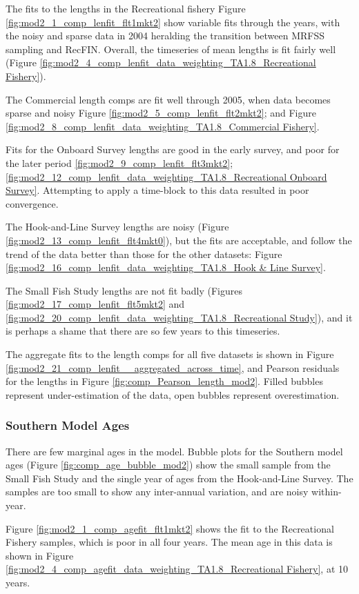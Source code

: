 \documentclass[12pt,]{article}
\begin{document}
The fits to the lengths in the Recreational fishery Figure
\ref{fig:mod2_1_comp_lenfit_flt1mkt2} show variable fits through the
years, with the noisy and sparse data in 2004 heralding the transition
between MRFSS sampling and RecFIN. Overall, the timeseries of mean
lengths is fit fairly well (Figure
\ref{fig:mod2_4_comp_lenfit_data_weighting_TA1.8_Recreational Fishery}).

The Commercial length comps are fit well through 2005, when data becomes
sparse and noisy Figure \ref{fig:mod2_5_comp_lenfit_flt2mkt2}; and
Figure
\ref{fig:mod2_8_comp_lenfit_data_weighting_TA1.8_Commercial Fishery}.

Fits for the Onboard Survey lengths are good in the early survey, and
poor for the later period \ref{fig:mod2_9_comp_lenfit_flt3mkt2};
\ref{fig:mod2_12_comp_lenfit_data_weighting_TA1.8_Recreational Onboard Survey}.
Attempting to apply a time-block to this data resulted in poor
convergence.

The Hook-and-Line Survey lengths are noisy (Figure
\ref{fig:mod2_13_comp_lenfit_flt4mkt0}), but the fits are acceptable,
and follow the trend of the data better than those for the other
datasets: Figure
\ref{fig:mod2_16_comp_lenfit_data_weighting_TA1.8_Hook & Line Survey}.

The Small Fish Study lengths are not fit badly (Figures
\ref{fig:mod2_17_comp_lenfit_flt5mkt2} and
\ref{fig:mod2_20_comp_lenfit_data_weighting_TA1.8_Recreational Study}),
and it is perhaps a shame that there are so few years to this
timeseries.

The aggregate fits to the length comps for all five datasets is shown in
Figure \ref{fig:mod2_21_comp_lenfit__aggregated_across_time}, and
Pearson residuals for the lengths in Figure
\ref{fig:comp_Pearson_length_mod2}. Filled bubbles represent
under-estimation of the data, open bubbles represent overestimation.

\subsubsection{Southern Model Ages}\label{southern-model-ages}

There are few marginal ages in the model. Bubble plots for the Southern
model ages (Figure \ref{fig:comp_age_bubble_mod2}) show the small sample
from the Small Fish Study and the single year of ages from the
Hook-and-Line Survey. The samples are too small to show any inter-annual
variation, and are noisy within-year.

Figure \ref{fig:mod2_1_comp_agefit_flt1mkt2} shows the fit to the
Recreational Fishery samples, which is poor in all four years. The mean
age in this data is shown in Figure
\ref{fig:mod2_4_comp_agefit_data_weighting_TA1.8_Recreational Fishery},
at 10 years.
\end{document}

